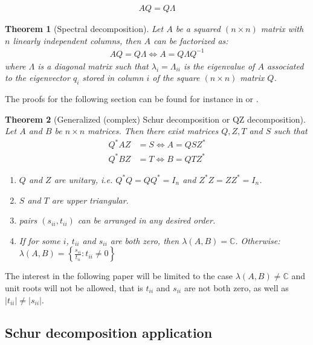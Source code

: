 \documentclass{pracamgr}
\numberwithin{equation}{section}
\newtheorem{theorem}{Theorem}
\begin{document}
\begin{align}
AQ = Q\Lambda
\end{align}

\begin{theorem}[Spectral decomposition]
Let $A$ be a squared $(n\times n)$ matrix with $n$ linearly independent columns, then $A$ can be factorized as:
  \begin{align*}
  AQ = Q \Lambda \Leftrightarrow A = Q \Lambda Q^{-1}
  \end{align*} 
where $\Lambda$ is a diagonal matrix such that $\lambda_i =\Lambda_{ii}$ is the eigenvalue of $A$ associated to the eigenvector $q_i$ stored in column $i$ of the square $(n \times n)$ matrix $Q$.
\end{theorem}

The proofs for the following section can be found for instance in \citet{roman2008graduate} or \citet{brown1988second}.  

\begin{theorem}[Generalized (complex) Schur decomposition or QZ decomposition]
Let $A$ and $B$ be $n\times n$ matrices. Then there exist matrices $Q,Z,T$ and $S$ such that
\begin{align*}
  Q^* A Z &= S \Leftrightarrow A = Q S Z^*\\
  Q^* B Z &= T \Leftrightarrow B = Q T Z^*
\end{align*}
\begin{enumerate}
  \item $Q$ and $Z$ are unitary, i.e. $Q^*Q=QQ^*=I_n$ and $Z^*Z=ZZ^*=I_n$.
  \item $S$ and $T$ are upper triangular.
 \item pairs $(s_{ii},t_{ii})$ can be arranged in any desired order.
  \item If for some $i$, $t_{ii}$ and $s_{ii}$ are both zero, then $\lambda(A,B)=\mathbb{C}$. Otherwise:
$\lambda(A,B) = \left\{\frac{s_{ii}}{t_{ii}}:t_{ii} \neq 0 \right\}$
\end{enumerate}
\end{theorem}

The interest in the following paper will be limited to the case $\lambda(A,B)\neq \mathbb{C}$ and unit roots will not be allowed, that is $t_{ii}$ and $s_{ii}$ are not both zero, as well as $|t_{ii}|\neq |s_{ii}|$.

\subsection{Schur decomposition application}
\end{document}
